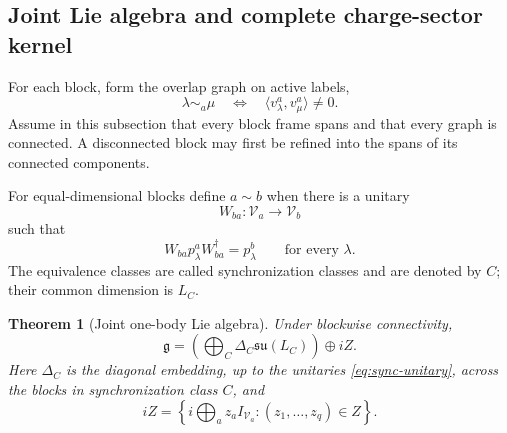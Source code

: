 \documentclass[11pt]{article}
\numberwithin{equation}{section}
\newtheorem{theorem}{Theorem}[section]
\newcommand{\cV}{\mathcal V}
\newcommand{\fg}{\mathfrak g}
\begin{document}
\subsection{Joint Lie algebra and complete charge-sector kernel}

For each block, form the overlap graph on active labels,
\begin{equation}
 \lambda\sim_a\mu
 \quad\Longleftrightarrow\quad
 \langle v_\lambda^a,v_\mu^a\rangle\ne0.
 \label{eq:block-overlap-graph}
\end{equation}
Assume in this subsection that every block frame spans and that every graph is connected.  A disconnected block may first be refined into the spans of its connected components.

For equal-dimensional blocks define $a\sim b$ when there is a unitary
\begin{equation}
 W_{ba}:\cV_a\longrightarrow\cV_b
 \label{eq:sync-unitary}
\end{equation}
such that
\begin{equation}
 W_{ba}p_\lambda^aW_{ba}^\dagger=p_\lambda^b
 \qquad
 \text{for every }\lambda.
 \label{eq:synchronization}
\end{equation}
The equivalence classes are called synchronization classes and are denoted by $C$; their common dimension is $L_C$.

\begin{theorem}[Joint one-body Lie algebra]
\label{thm:joint-lie}
Under blockwise connectivity,
\begin{equation}
 \boxed{
 \fg
 =
 \left(
 \bigoplus_C\Delta_C\mathfrak{su}(L_C)
 \right)
 \oplus iZ.}
 \label{eq:joint-lie-structure}
\end{equation}
Here $\Delta_C$ is the diagonal embedding, up to the unitaries \eqref{eq:sync-unitary}, across the blocks in synchronization class $C$, and
\begin{equation}
 iZ
 =
 \left\{
 i\bigoplus_a z_aI_{\cV_a}:
 (z_1,\ldots,z_q)\in Z
 \right\}.
 \label{eq:iZ}
\end{equation}
\end{theorem}
\end{document}
